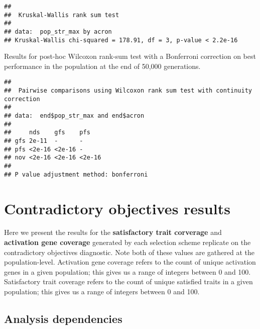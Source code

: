 \documentclass[]{book}
\newenvironment{Shaded}{\begin{snugshade}}{\end{snugshade}}
\newcommand{\DataTypeTok}[1]{\textcolor[rgb]{0.13,0.29,0.53}{#1}}
\newcommand{\KeywordTok}[1]{\textcolor[rgb]{0.13,0.29,0.53}{\textbf{#1}}}
\newcommand{\NormalTok}[1]{#1}
\newcommand{\OperatorTok}[1]{\textcolor[rgb]{0.81,0.36,0.00}{\textbf{#1}}}
\newcommand{\OtherTok}[1]{\textcolor[rgb]{0.56,0.35,0.01}{#1}}
\newcommand{\StringTok}[1]{\textcolor[rgb]{0.31,0.60,0.02}{#1}}
\begin{document}
\begin{verbatim}
## 
##  Kruskal-Wallis rank sum test
## 
## data:  pop_str_max by acron
## Kruskal-Wallis chi-squared = 178.91, df = 3, p-value < 2.2e-16
\end{verbatim}

Results for post-hoc Wilcoxon rank-sum test with a Bonferroni correction on best performance in the population at the end of 50,000 generations.

\begin{Shaded}
\end{Shaded}

\begin{verbatim}
## 
##  Pairwise comparisons using Wilcoxon rank sum test with continuity correction 
## 
## data:  end$pop_str_max and end$acron 
## 
##     nds    gfs    pfs   
## gfs 2e-11  -      -     
## pfs <2e-16 <2e-16 -     
## nov <2e-16 <2e-16 <2e-16
## 
## P value adjustment method: bonferroni
\end{verbatim}

\hypertarget{contradictory-objectives-results}{%
\chapter{Contradictory objectives results}\label{contradictory-objectives-results}}

Here we present the results for the \textbf{satisfactory trait corverage} and \textbf{activation gene coverage} generated by each selection scheme replicate on the contradictory objectives diagnostic.
Note both of these values are gathered at the population-level.
Activation gene coverage refers to the count of unique activation genes in a given population; this gives us a range of integers between 0 and 100.
Satisfactory trait coverage refers to the count of unique satisfied traits in a given population; this gives us a range of integers between 0 and 100.

\hypertarget{analysis-dependencies-2}{%
\section{Analysis dependencies}\label{analysis-dependencies-2}}
\end{document}
